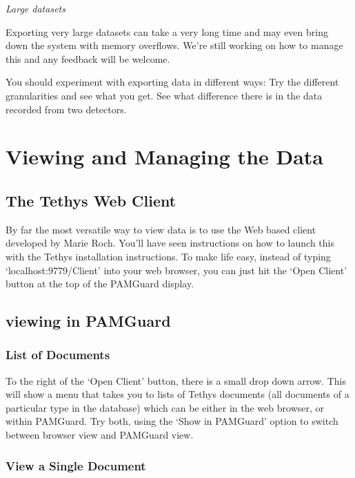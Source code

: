 \documentclass[
]{article}
\begin{document}
\emph{Large datasets}

Exporting very large datasets can take a very long time and may even
bring down the system with memory overflows. We're still working on how
to manage this and any feedback will be welcome.

You should experiment with exporting data in different ways: Try the
different granularities and see what you get. See what difference there
is in the data recorded from two detectors.

\section{Viewing and Managing the Data}\label{sec-viewing}

\subsection{The Tethys Web Client}\label{the-tethys-web-client}

By far the most versatile way to view data is to use the Web based
client developed by Marie Roch. You'll have seen instructions on how to
launch this with the Tethys installation instructions. To make life
easy, instead of typing `localhost:9779/Client' into your web browser,
you can just hit the `Open Client' button at the top of the PAMGuard
display.

\subsection{viewing in PAMGuard}\label{viewing-in-pamguard}

\subsubsection{List of Documents}\label{list-of-documents}

To the right of the `Open Client' button, there is a small drop down
arrow. This will show a menu that takes you to lists of Tethys documents
(all documents of a particular type in the database) which can be either
in the web browser, or within PAMGuard. Try both, using the `Show in
PAMGuard' option to switch between browser view and PAMGuard view.

\subsubsection{View a Single Document}\label{view-a-single-document}
\end{document}
